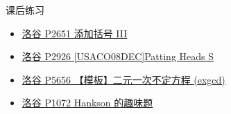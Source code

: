 \begin{frame}[fragile]{课后练习}
	\begin{itemize}
		\item \href{https://www.luogu.com.cn/problem/P2651}{洛谷 P2651 添加括号 III}
		\item \href{https://www.luogu.com.cn/problem/P2926}{洛谷 P2926 [USACO08DEC]Patting Heads S}
		\item \href{https://www.luogu.com.cn/problem/P5656}{洛谷 P5656 【模板】二元一次不定方程 (exgcd)}
		\item \href{https://www.luogu.com.cn/problem/P1072}{洛谷 P1072 Hankson 的趣味题}
	\end{itemize}
\end{frame}
